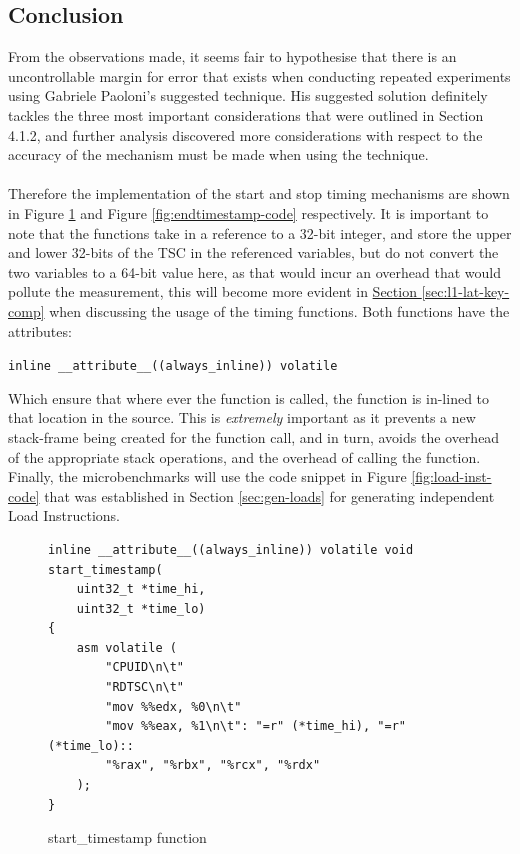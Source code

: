 \documentclass[bsc,frontabs,twoside,singlespacing,parskip,deptreport]{infthesis}     %
\begin{document}

\subsection{Conclusion}
From the observations made, it seems fair to hypothesise that there is an uncontrollable margin for error that exists when conducting repeated experiments using Gabriele Paoloni's suggested technique\cite{code_exec_times}. His suggested solution definitely tackles the three most important considerations that were outlined in Section 4.1.2, and further analysis discovered more considerations with respect to the accuracy of the mechanism must be made when using the technique. \\
\\
Therefore the implementation of the start and stop timing mechanisms are shown in Figure \ref{fig:starttimestamp-code} and Figure \ref{fig:endtimestamp-code} respectively. It is important to note that the functions take in a reference to a 32-bit integer, and store the upper and lower 32-bits of the TSC in the referenced variables, but do not convert the two variables to a 64-bit value here, as that would incur an overhead that would pollute the measurement, this will become more evident in \hyperref[sec:l1-lat-key-comp]{Section \ref{sec:l1-lat-key-comp}} when discussing the usage of the timing functions. Both functions have the attributes:
    
    \begin{center}
        \texttt{inline \_\_attribute\_\_((always\_inline)) volatile}
    \end{center}
Which ensure that where ever the function is called, the function is in-lined to that location in the source. This is \emph{extremely} important as it prevents a new stack-frame being created for the function call, and in turn, avoids the overhead of the appropriate stack operations, and the overhead of calling the function. Finally, the microbenchmarks will use the code snippet in Figure \ref{fig:load-inst-code} that was established in Section \ref{sec:gen-loads} for generating independent Load Instructions.

\begin{figure}[h!]
    \centering
    \begin{verbatim}
inline __attribute__((always_inline)) volatile void start_timestamp(
    uint32_t *time_hi,
    uint32_t *time_lo)
{
    asm volatile (
        "CPUID\n\t"
        "RDTSC\n\t"
        "mov %%edx, %0\n\t"
        "mov %%eax, %1\n\t": "=r" (*time_hi), "=r" (*time_lo)::
        "%rax", "%rbx", "%rcx", "%rdx"
    );
}
    \end{verbatim}
    \caption{start\_timestamp function}
    \label{fig:starttimestamp-code}
\end{figure}
\end{document}
